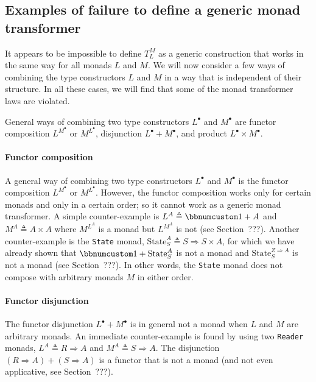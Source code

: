 \subsection{Examples of failure to define a generic monad transformer}

It appears to be impossible to define $T_{L}^{M}$ as a generic construction
that works in the same way for all monads $L$ and $M$. We will now
consider a few ways of combining the type constructors $L$ and $M$
in a way that is independent of their structure. In all these cases,
we will find that some of the monad transformer laws are violated.

General ways of combining two type constructors $L^{\bullet}$ and
$M^{\bullet}$ are functor composition $L^{M^{\bullet}}$ or $M^{L^{\bullet}}$,
disjunction $L^{\bullet}+M^{\bullet}$, and product $L^{\bullet}\times M^{\bullet}$. 

\paragraph{Functor composition}

A general way of combining two type constructors $L^{\bullet}$ and
$M^{\bullet}$ is the functor composition $L^{M^{\bullet}}$ or $M^{L^{\bullet}}$.
However, the functor composition works only for certain monads and
only in a certain order; so it cannot work as a generic monad transformer.
A simple counter-example is $L^{A}\triangleq\bbnum 1+A$ and $M^{A}\triangleq A\times A$
where $M^{L^{A}}$ is a monad but $L^{M^{A}}$ is not (see Section~???).
Another counter-example is the \lstinline!State!
monad, $\text{State}_{S}^{A}\triangleq S\Rightarrow S\times A$, for
which we have already shown that $\bbnum 1+\text{State}_{S}^{A}$
is not a monad and $\text{State}_{S}^{Z\Rightarrow A}$ is not a monad
(see Section~???). In other words, the \lstinline!State!
monad does not compose with arbitrary monads $M$ in either order.

\paragraph{Functor disjunction}

The functor disjunction $L^{\bullet}+M^{\bullet}$ is in general not
a monad when $L$ and $M$ are arbitrary monads. An immediate counter-example
is found by using two \lstinline!Reader!
monads, $L^{A}\triangleq R\Rightarrow A$ and $M^{A}\triangleq S\Rightarrow A$.
The disjunction $\left(R\Rightarrow A\right)+\left(S\Rightarrow A\right)$
is a functor that is not a monad (and not even applicative, see Section~???).

